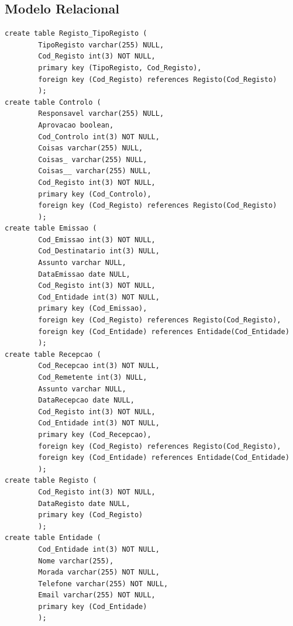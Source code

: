 \documentclass[a4paper]{article}
\begin{document}
\begin{appendix}
\section{Modelo Relacional}
\begin{small}
\begin{lstlisting}
create table Registo_TipoRegisto (
        TipoRegisto varchar(255) NULL,
        Cod_Registo int(3) NOT NULL,
        primary key (TipoRegisto, Cod_Registo),
        foreign key (Cod_Registo) references Registo(Cod_Registo)
        );
create table Controlo (
        Responsavel varchar(255) NULL,
        Aprovacao boolean,
        Cod_Controlo int(3) NOT NULL,
        Coisas varchar(255) NULL,
        Coisas_ varchar(255) NULL,
        Coisas__ varchar(255) NULL,
        Cod_Registo int(3) NOT NULL,
        primary key (Cod_Controlo),
        foreign key (Cod_Registo) references Registo(Cod_Registo)
        );
create table Emissao (
        Cod_Emissao int(3) NOT NULL,
        Cod_Destinatario int(3) NULL,
        Assunto varchar NULL,
        DataEmissao date NULL,
        Cod_Registo int(3) NOT NULL,
        Cod_Entidade int(3) NOT NULL,
        primary key (Cod_Emissao),
        foreign key (Cod_Registo) references Registo(Cod_Registo),
        foreign key (Cod_Entidade) references Entidade(Cod_Entidade)
        );
create table Recepcao (
        Cod_Recepcao int(3) NOT NULL,
        Cod_Remetente int(3) NULL,
        Assunto varchar NULL,
        DataRecepcao date NULL,
        Cod_Registo int(3) NOT NULL,
        Cod_Entidade int(3) NOT NULL,
        primary key (Cod_Recepcao),
        foreign key (Cod_Registo) references Registo(Cod_Registo),
        foreign key (Cod_Entidade) references Entidade(Cod_Entidade)
        );
create table Registo (
        Cod_Registo int(3) NOT NULL,
        DataRegisto date NULL,
        primary key (Cod_Registo)
        );
create table Entidade (
        Cod_Entidade int(3) NOT NULL,
        Nome varchar(255),
        Morada varchar(255) NOT NULL,
        Telefone varchar(255) NOT NULL,
        Email varchar(255) NOT NULL,
        primary key (Cod_Entidade)
        );
\end{lstlisting}
\end{small}


\end{appendix}

\newpage

\printglossary
{}
\end{document}
